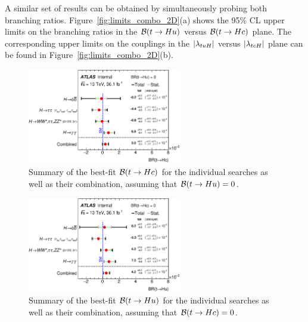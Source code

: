 A similar set of results can be obtained by  simultaneously probing both branching ratios. 
Figure~\ref{fig:limits_combo_2D}(a) shows the 95\% CL upper limits on the branching ratios in the $\mathcal{B}(t\to Hu)$ versus $\mathcal{B}(t\to Hc)$ plane. 
The corresponding upper limits on the couplings in the $|\lambda_{tuH}|$ versus $|\lambda_{tcH}|$ plane can be found in Figure~\ref{fig:limits_combo_2D}(b).

\begin{figure}[t!]
\begin{center}
\includegraphics[width=0.6\textwidth]{figures/Combo/POI.eps}
\caption{\small {Summary of the best-fit $\mathcal{B}(t\to Hc)$ for the individual searches as well as their combination,
assuming that $\mathcal{B}(t\to Hu)=0$. }}
\label{fig:summary_printnum_hc} 
\end{center}
\end{figure}
\begin{figure}[h!]
\begin{center}
\includegraphics[width=0.6\textwidth]{figures/Combo/POI2.eps}
\caption{\small {Summary of the best-fit $\mathcal{B}(t\to Hu)$ for the individual searches as well as their combination,
assuming that $\mathcal{B}(t\to Hc)=0$. }}
\label{fig:summary_printnum_hu} 
\end{center}
\end{figure}

